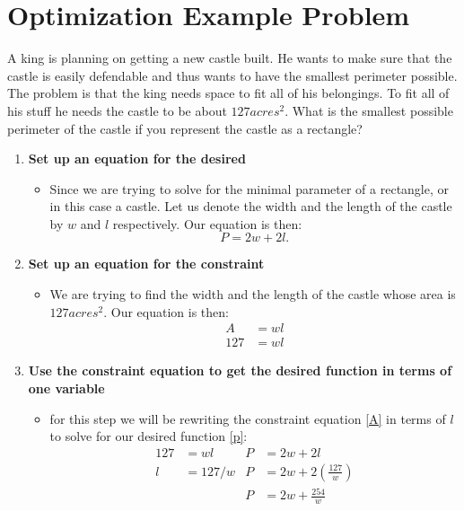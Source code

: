 \documentclass[12pt]{article}
\begin{document}
\section{Optimization Example Problem}
A king is planning on getting a new castle built. He wants to make sure that the castle is easily defendable and thus wants to have the smallest perimeter possible. The problem is that the king needs space to fit all of his belongings. To fit all of his stuff he needs the castle to be about $127 acres^2$. What is the smallest possible perimeter of the castle if you represent the castle as a rectangle?
\begin{enumerate}
  \item \textbf{Set up an equation for the desired}
    \begin{itemize}
      \item Since we are trying to solve for the minimal parameter of a rectangle, or in this case a castle. Let us denote the width and the length of the castle by $w$ and $l$ respectively. Our equation is then:
      \begin{equation}
        P = 2w + 2l. \tag{Parimeter of Castle} \label{p}
      \end{equation}
    \end{itemize}

  \item \textbf{Set up an equation for the constraint}
    \begin{itemize}
      \item We are trying to find the width and the length of the castle whose area is $127 acres^2$. Our equation is then:
      \begin{equation}
        \begin{split}
          A &= w l\\
          127 &= wl
        \end{split}
        \tag{Area of Castle} \label{A}
      \end{equation}
    \end{itemize}

  \item \textbf{Use the constraint equation to get the desired function in terms of one variable}
    \begin{itemize}
      \item for this step we will be rewriting the constraint equation \eqref{A} in terms of $l$ to solve for our desired function \eqref{p}:
      \begin{equation}
        \begin{align*}
          127 &= wl         &  P &= 2w + 2l\\
          l &= 127/w        &  P &= 2w + 2(\frac{127}{w})\\
          &                 &  P &= 2w + \frac{254}{w}\\
        \end{align*}
        \tag{Desired in terms of L} \label{DITOL}
      \end{equation}
    \end{itemize}


\end{enumerate}
\end{document}
